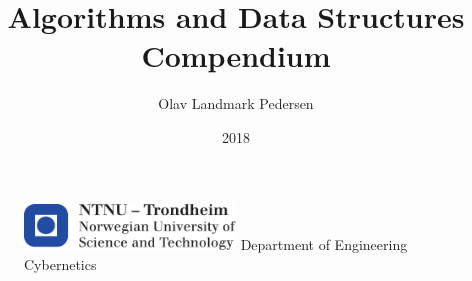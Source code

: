 \documentclass[11pt, a4paper, USenglish]{article}
\begin{document}
\title{Algorithms and Data Structures Compendium}
\author{Olav Landmark Pedersen}
\date{2018}
\begin{titlepage}
    \maketitle
    \begin{figure}
    \centering
    \includegraphics[width=0.5\textwidth]{images/logontnu_eng.pdf}
    Department of Engineering Cybernetics
    \end{figure}
    \thispagestyle{empty}
\end{titlepage}

\newpage
\tableofcontents
\thispagestyle{empty} %

\newpage
\setcounter{page}{1}








% 
% 
% 
% 
% 
% 
% 
% 
% 
% 
% 
% 
% 
% 
% 
% 
% 
% 


\newpage
{}
\label{sec:bibliography}
\end{document}
